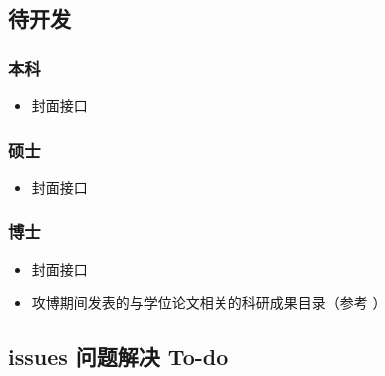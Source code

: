 \subsection{待开发}

\subsubsection{本科}

\begin{itemize}
  \item 封面接口
\end{itemize}


\subsubsection{硕士}

\begin{itemize}
  \item 封面接口
\end{itemize}


\subsubsection{博士}

\begin{itemize}
  \item 封面接口
  \item 攻博期间发表的与学位论文相关的科研成果目录（参考 ）
\end{itemize}



\subsection{issues 问题解决 To-do}

